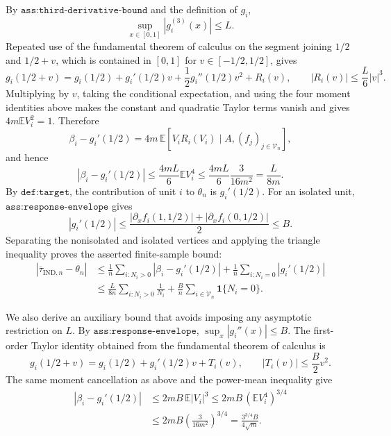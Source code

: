 By \(\texttt{ass:third-derivative-bound}\) and the definition of \(g_i\),
\[
\sup_{x\in[0,1]}\left|g_i^{(3)}(x)\right|\le L.
\]
Repeated use of the fundamental theorem of calculus on the segment joining \(1/2\) and \(1/2+v\), which is contained in \([0,1]\) for \(v\in[-1/2,1/2]\), gives
\[
g_i(1/2+v)
=g_i(1/2)+g_i'(1/2)v+\frac12g_i''(1/2)v^2+R_i(v),
\qquad
|R_i(v)|\le\frac L6|v|^3.
\]
Multiplying by \(v\), taking the conditional expectation, and using the four moment identities above makes the constant and quadratic Taylor terms vanish and gives \(4m\mathbb E V_i^2=1\).  Therefore
\[
\beta_i-g_i'(1/2)
=4m\,\mathbb E\!\left[V_iR_i(V_i)\mid A,(f_j)_{j\in\mathcal V_n}\right],
\]
and hence
\[
\left|\beta_i-g_i'(1/2)\right|
\le \frac{4mL}{6}\mathbb E V_i^4
\le \frac{4mL}{6}\frac3{16m^2}
=\frac{L}{8m}.
\]
By \(\texttt{def:target}\), the contribution of unit \(i\) to \(\theta_n\) is \(g_i'(1/2)\).  For an isolated unit, \(\texttt{ass:response-envelope}\) gives
\[
|g_i'(1/2)|
\le\frac{|\partial_xf_i(1,1/2)|+|\partial_xf_i(0,1/2)|}{2}
\le B.
\]
Separating the nonisolated and isolated vertices and applying the triangle inequality proves the asserted finite-sample bound:
\[
\begin{aligned}
\left|\bar\tau_{\mathrm{IND},n}-\theta_n\right|
&\le \frac1n\sum_{i:N_i>0}\left|\beta_i-g_i'(1/2)\right|
+\frac1n\sum_{i:N_i=0}|g_i'(1/2)|\\
&\le \frac{L}{8n}\sum_{i:N_i>0}\frac1{N_i}
+\frac Bn\sum_{i\in\mathcal V_n}\mathbf1\{N_i=0\}.
\end{aligned}
\]

We also derive an auxiliary bound that avoids imposing any asymptotic restriction on \(L\).  By \(\texttt{ass:response-envelope}\), \(\sup_x|g_i''(x)|\le B\).  The first-order Taylor identity obtained from the fundamental theorem of calculus is
\[
g_i(1/2+v)=g_i(1/2)+g_i'(1/2)v+T_i(v),
\qquad
|T_i(v)|\le\frac B2v^2.
\]
The same moment cancellation as above and the power-mean inequality give
\[
\begin{aligned}
|\beta_i-g_i'(1/2)|
&\le 2mB\,\mathbb E|V_i|^3
\le 2mB\,(\mathbb E V_i^4)^{3/4}\\
&\le 2mB\left(\frac3{16m^2}\right)^{3/4}
=\frac{3^{3/4}B}{4\sqrt m}.
\end{aligned}
\]

